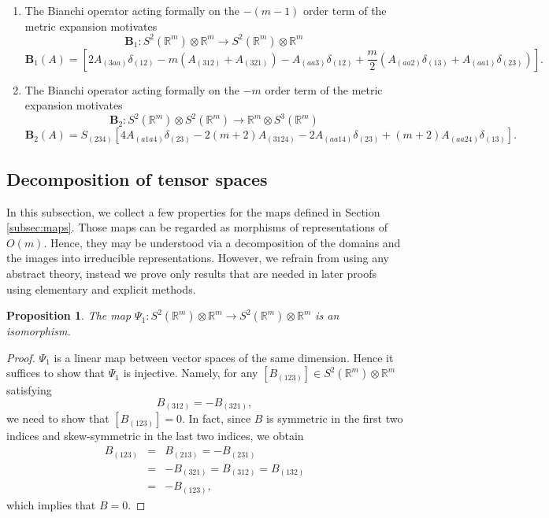 \documentclass{amsart}
\newtheorem{prop}[thm]{Proposition}
\newcommand{\Real}{\mathbb R}
\numberwithin{equation}{section}
\begin{document}
\begin{enumerate}
	\item The Bianchi operator acting formally on the $-(m-1)$ order term of the metric expansion motivates
		\[
			{\mathbf B}_1: S^2(\Real^m)\otimes \Real^m \to S^2(\Real^m)  \otimes \Real^m
		\]
		\begin{equation*}
			{\mathbf B}_1 (A)= [2A_{(3aa)}\delta_{(12)} - m(A_{(312)}+A_{(321)}) - A_{(aa3)}\delta_{(12)}+\frac{m}{2}(A_{(aa2)}\delta_{(13)}+A_{(aa1)}\delta_{(23)})].
		\end{equation*}
	\item The Bianchi operator acting formally on the $-m$ order term of the metric expansion motivates
		\[
			{\mathbf B}_2: S^2(\Real^m)\otimes S^2(\Real^m)\to \Real^m \otimes S^3(\Real^m)
		\]
		\[
			{\mathbf B}_2(A)= S_{(234)}[4A_{(a1a4)}\delta_{(23)}-2(m+2)A_{(3124)}-2A_{(aa14)}\delta_{(23)}+(m+2)A_{(aa24)}\delta_{(13)}].
		\]
\end{enumerate}


\subsection{Decomposition of tensor spaces}

In this subsection, we collect a few properties for the maps defined in Section \ref{subsec:maps}. Those maps can be regarded as morphisms of representations of $O(m)$. Hence, they may be understood via a decomposition of the domains and the images into irreducible representations. However, we refrain from using any abstract theory, instead we prove only results that are needed in later proofs using elementary and explicit methods.

\begin{prop}
	\label{prop:psi1}
	The map $\Psi_1: S^2(\Real^m)\otimes \Real^m\to S^2(\Real^m)\otimes \Real^m$ is an isomorphism.
\end{prop}
\begin{proof}
	$\Psi_1$ is a linear map between vector spaces of the same dimension. Hence it suffices to show that $\Psi_1$ is injective. Namely, for any $[B_{(123)}]\in S^2(\Real^m)\otimes \Real^m$ satisfying 
	\[
		B_{(312)}= -B_{(321)},
	\]
	we need to show that $[B_{(123)}]=0$. In fact, since $B$ is symmetric in the first two indices and skew-symmetric in the last two indices, we obtain
	\begin{eqnarray*}
		B_{(123)} &=& B_{(213)} = -B_{(231)}\\
			  &=& -B_{(321)} = B_{(312)} = B_{(132)} \\
			  &=& -B_{(123)},
	\end{eqnarray*}
	which implies that $B=0$.
\end{proof}
\end{document}
